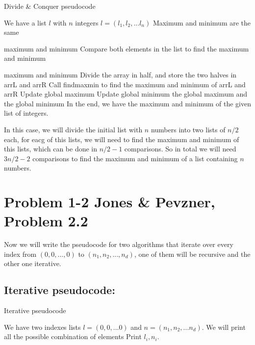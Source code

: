 \documentclass{article}
\begin{document}
\begin{algorithm}[H]
\caption{Divide \& Conquer pseudocode}
\begin{algorithmic}[1]
\State We have a list $l$ with $n$ integers $l = (l_1,l_2,...l_n)$
  \State Maximum and minimum are the same

  \Return maximum and minimum
 \EndIf
  \State Compare both elements in the list to find the maximum and minimum

  \Return maximum and minimum
 \EndIf
 \State Divide the array in half, and store the two halves in arrL and arrR
 \State Call findmaxmin to find the maximum and minimum of arrL and arrR
  \State Update global maximum
 \EndIf
  \State Update global minimum
 \EndIf
 \Return the global maximum and the global minimum
\EndFunction
\State In the end, we have the maximum and minimum of the given list of integers.
\end{algorithmic}
\end{algorithm}

In this case, we will divide the initial list with $n$ numbers into two lists of $n/2$ each, for eacg of this lists, we will need to find the maximum and minimum of this lists, which can be done in $n/2-1$ comparisons. So in total we will need $3n/2-2$ comparisons to find the maximum and minimum of a list containing $n$ numbers.

\section*{Problem 1-2 Jones \& Pevzner, Problem 2.2}

Now we will write the pseudocode for two algorithms that iterate over every index from $(0,0,...,0)$ to $(n_1,n_2,...,n_d)$, one of them will be recursive and the other one iterative.

\subsection*{Iterative pseudocode:}

\begin{algorithm}[H]
\caption{Iterative pseudocode}
\begin{algorithmic}[1]
\State We have two indexes lists $l = (0,0,...0)$ and $n = (n_1,n_2,...n_d)$.
\State We will print all the possible combination of elements
  \State Print $l_i,n_i$.
 \EndFor
\EndFor
\end{algorithmic}
\end{algorithm}
\end{document}
